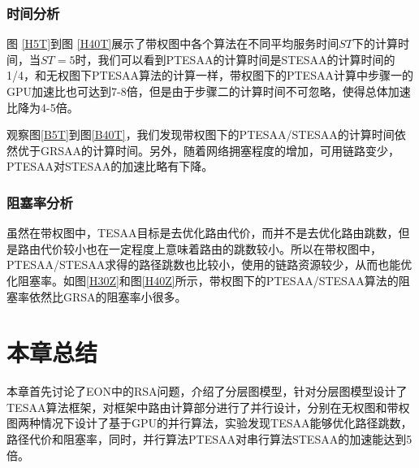 \subsubsection{时间分析}
图 \ref{H5T}到图 \ref{H40T}展示了带权图中各个算法在不同平均服务时间$ST$下的计算时间，当$ST=5$时，我们可以看到PTESAA的计算时间是STESAA的计算时间的1/4，和无权图下PTESAA算法的计算一样，带权图下的PTESAA计算中步骤一的GPU加速比也可达到7-8倍，但是由于步骤二的计算时间不可忽略，使得总体加速比降为4-5倍。

观察图\ref{B5T}到图\ref{B40T}，我们发现带权图下的PTESAA/STESAA的计算时间依然优于GRSAA的计算时间。另外，随着网络拥塞程度的增加，可用链路变少，PTESAA对STESAA的加速比略有下降。

\subsubsection{阻塞率分析}
虽然在带权图中，TESAA目标是去优化路由代价，而并不是去优化路由跳数，但是路由代价较小也在一定程度上意味着路由的跳数较小。所以在带权图中，PTESAA/STESAA求得的路径跳数也比较小，使用的链路资源较少，从而也能优化阻塞率。如图\ref{H30Z}和图\ref{H40Z}所示，带权图下的PTESAA/STESAA算法的阻塞率依然比GRSA的阻塞率小很多。

\section{本章总结}
本章首先讨论了EON中的RSA问题，介绍了分层图模型，针对分层图模型设计了TESAA算法框架，对框架中路由计算部分进行了并行设计，分别在无权图和带权图两种情况下设计了基于GPU的并行算法，实验发现TESAA能够优化路径跳数，路径代价和阻塞率，同时，并行算法PTESAA对串行算法STESAA的加速能达到5倍。

